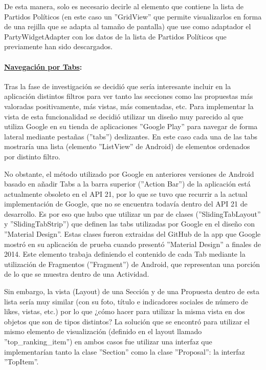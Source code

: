 		De esta manera, solo es necesario decirle al elemento que contiene la lista de Partidos Políticos (en este caso un ''GridView'' que permite visualizarlos en forma de una rejilla que se adapta al tamaño de pantalla) que use como adaptador el PartyWidgetAdapter con los datos de la lista de Partidos Políticos que previamente han sido descargados. \\
		
				
		\paragraph{\underline{Navegación por Tabs}:}
		
		Tras la fase de investigación se decidió que sería interesante incluir en la aplicación distintos filtros para ver tanto las secciones como las propuestas más valoradas positivamente, más vistas, más comentadas, etc. Para implementar la vista de esta funcionalidad se decidió utilizar un diseño muy parecido al que utiliza Google en su tienda de aplicaciones ''Google Play'' para navegar de forma lateral mediante pestañas (''tabs'') deslizantes. En este caso cada una de las tabs mostraría una lista (elemento ''ListView'' de Android) de elementos ordenados por distinto filtro.
		
		No obstante, el método utilizado por Google en anteriores versiones de Android basado en añadir Tabs a la barra superior (''Action Bar'')\cite{ref:android_actionBar} de la aplicación está actualmente obsoleto en el API 21, por lo que se tuvo que recurrir a la actual implementación de Google, que no se encuentra todavía dentro del API 21 de desarrollo. Es por eso que hubo que utilizar un par de clases (''SlidingTabLayout'' y ''SlidingTabStrip'') que definen las tabs utilizadas por Google en el diseño con ''Material Design''. Estas clases fueron extraidas del GitHub\cite{ref:android_tabGoogle} de la app que Google mostró en su aplicación de prueba cuando presentó ''Material Design'' a finales de 2014. Este elemento trabaja definiendo el contenido de cada Tab mediante la utilización de Fragmentos\cite{ref:android_fragment} (''Fragment'') de Android, que representan una porción de lo que se muestra dentro de una Actividad.
		
		Sin embargo, la vista (Layout) de una Sección y de una Propuesta dentro de esta lista sería muy similar (con su foto, título e indicadores sociales de número de likes, vistas, etc.) por lo que ¿cómo hacer para utilizar la misma vista en dos objetos que son de tipos distintos? La solución que se encontró para utilizar el mismo elemento de visualización (definido en el layout llamado ''top\_ranking\_item'') en ambos casos fue utilizar una interfaz que implementarían tanto la clase  ''Section'' como la clase ''Proposal'': la interfaz ''TopItem''.
		
